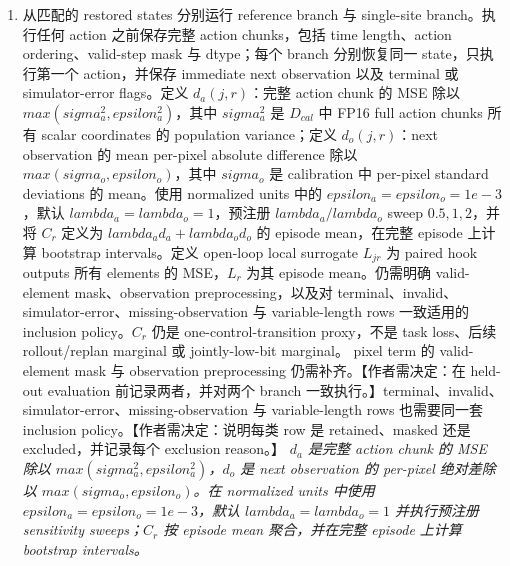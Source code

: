 \documentclass[10pt,a4paper]{article}
\begin{document}
\begin{enumerate}[leftmargin=*,start=2]
  \item 从匹配的 restored states 分别运行 reference branch 与 single-site branch。执行任何 action 之前保存完整 action chunks，包括 time length、action ordering、valid-step mask 与 dtype；每个 branch 分别恢复同一 state，只执行第一个 action，并保存 immediate next observation 以及 terminal 或 simulator-error flags。定义 \(d_{a}(j,r)\)：完整 action chunk 的 MSE 除以 \(max(sigma_{a}^{2}, epsilon_{a}^{2})\)，其中 \(sigma_{a}^{2}\) 是 \(D_{cal}\) 中 FP16 full action chunks 所有 scalar coordinates 的 population variance；定义 \(d_{o}(j,r)\)：next observation 的 mean per-pixel absolute difference 除以 \(max(sigma_{o}, epsilon_{o})\)，其中 \(sigma_{o}\) 是 calibration 中 per-pixel standard deviations 的 mean。使用 normalized units 中的 \(epsilon_{a}=epsilon_{o}=1e-3\)，默认 \(lambda_{a}=lambda_{o}=1\)，预注册 \(lambda_{a}/lambda_{o}\) sweep \({0.5,1,2}\)，并将 \(C_{r}\) 定义为 \(lambda_{a} d_{a}+lambda_{o} d_{o}\) 的 episode mean，在完整 episode 上计算 bootstrap intervals。定义 open-loop local surrogate \(L_{jr}\) 为 paired hook outputs 所有 elements 的 MSE，\(L_{r}\) 为其 episode mean。仍需明确 valid-element mask、observation preprocessing，以及对 terminal、invalid、simulator-error、missing-observation 与 variable-length rows 一致适用的 inclusion policy。\(C_{r}\) 仍是 one-control-transition proxy，不是 task loss、后续 rollout/replan marginal 或 jointly-low-bit marginal。 pixel term 的 valid-element mask 与 observation preprocessing 仍需补齐。【作者需决定：在 held-out evaluation 前记录两者，并对两个 branch 一致执行。】terminal、invalid、simulator-error、missing-observation 与 variable-length rows 也需要同一套 inclusion policy。【作者需决定：说明每类 row 是 retained、masked 还是 excluded，并记录每个 exclusion reason。】
\noindent\emph{\(d_{a}\) 是完整 action chunk 的 MSE 除以 \(max(sigma_{a}^{2}, epsilon_{a}^{2})\)，\(d_{o}\) 是 next observation 的 per-pixel 绝对差除以 \(max(sigma_{o}, epsilon_{o})\)。在 normalized units 中使用 \(epsilon_{a}=epsilon_{o}=1e-3\)，默认 \(lambda_{a}=lambda_{o}=1\) 并执行预注册 sensitivity sweeps；\(C_{r}\) 按 episode mean 聚合，并在完整 episode 上计算 bootstrap intervals。}
\par{}

\end{enumerate}
\end{document}
